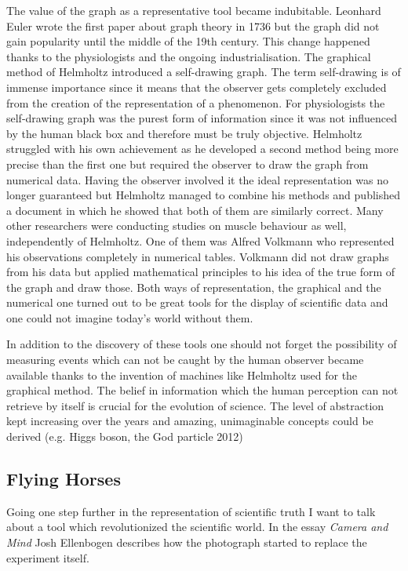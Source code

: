 \documentclass[12pt,a4paper]{article}
\begin{document}
The value of the graph as a representative tool became indubitable. Leonhard Euler wrote the first
paper about graph theory in 1736 \cite{graphtheory} but the graph did not gain popularity until the middle of
the 19th century. This change happened thanks to the physiologists and the ongoing industrialisation.
The graphical method of Helmholtz introduced a self-drawing graph. The term self-drawing is 
of immense importance since it means that the observer gets completely excluded from the creation
of the representation of a phenomenon. For physiologists the self-drawing graph was the purest form
of information since it was not influenced by the human black box and therefore must be truly objective.
Helmholtz struggled with his own achievement as he developed a second method being more precise than
the first one but required the observer to draw the graph from numerical data.
Having the observer involved it the ideal representation was no longer guaranteed but Helmholtz managed
to combine his methods and published a document in which he showed that both of them are
similarly correct. Many other researchers were conducting studies on muscle behaviour as well, independently
of Helmholtz. One of them was Alfred Volkmann who represented his observations completely in numerical
tables. Volkmann did not draw graphs from his data but applied mathematical principles to
his idea of the true form of the graph and draw those. Both ways of representation, the graphical and
the numerical one turned out to be great tools for the display of scientific data and one could not
imagine today's world without them.

In addition to the discovery of these tools one should not forget the possibility of measuring
events which can not be caught by the human observer became available thanks to the invention of
machines like Helmholtz used for the graphical method. The belief in information which the
human perception can not retrieve by itself is crucial for the evolution of science.
The level of abstraction kept increasing over the years and amazing, unimaginable concepts could be derived
(e.g. Higgs boson, the God particle 2012)

\subsection*{Flying Horses}

Going one step further in the representation of scientific truth I want to talk about a
tool which revolutionized the scientific world. In the essay {\it{Camera and Mind}} \cite{ellenbogen} Josh
Ellenbogen describes how the photograph started to replace the experiment itself.
\end{document}
